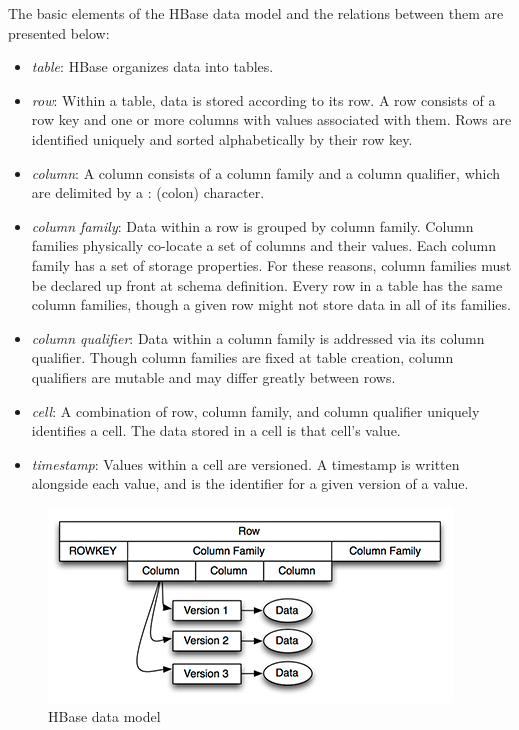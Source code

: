 The basic elements of the HBase data model and the relations between them are presented below:
\begin{itemize}
\item \emph{table}: HBase organizes data into tables.
\item \emph{row}: Within a table, data is stored according to its row. A row consists of a row key and one or more columns with values associated with them. Rows are identified uniquely and sorted alphabetically by their row key.
\item \emph{column}: A column consists of a column family and a column qualifier, which are delimited by a : (colon) character.
\item \emph{column family}: Data within a row is grouped by column family. Column families physically co-locate a set of columns and their values. Each column family has a set of storage properties. For these reasons, column families must be declared up front at schema definition. Every row in a table has the same column families, though a given row might not store data in all of its families.
\item \emph{column qualifier}: Data within a column family is addressed via its column qualifier. Though column families are fixed at table creation, column qualifiers are mutable and may differ greatly between rows.
\item \emph{cell}: A combination of row, column family, and column qualifier uniquely identifies a cell. The data stored in a cell is that cell's value.
\item \emph{timestamp}: Values within a cell are versioned. A timestamp is written alongside each value, and is the identifier for a given version of a value.
\end{itemize}

\begin{figure}[h!]
\centering
\includegraphics{figures/hbase_data_model}
\caption{HBase data model}
\label{figure:hbase_data_model}
\end{figure}

